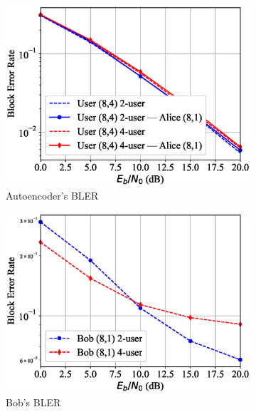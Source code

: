 \begin{figure}[tp!]
	\begin{subfigure}{0.32\textwidth}
		\includegraphics[width=\linewidth]{figs/multi_covert_autoencoder_bler_rayleigh}
		\caption{Autoencoder's BLER}
		\label{fig:multi_rayleigh_results_ae}
	\end{subfigure}
	\hspace*{\fill}
	\begin{subfigure}{0.32\textwidth}
		\includegraphics[width=\linewidth]{figs/multi_bob_bler_rayleigh}
		\caption{Bob's BLER}
		\label{fig:multi_rayleigh_results_bob}	
	\end{subfigure}
	\hspace*{\fill}
	\begin{subfigure}{0.32\textwidth}

\end{subfigure}
\end{figure}
